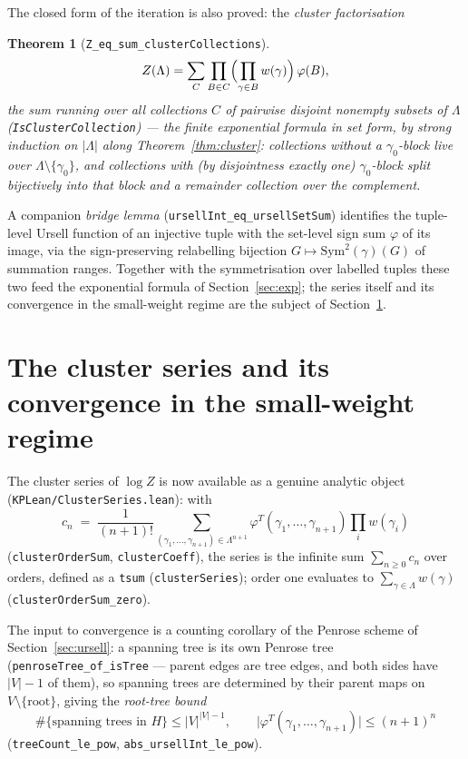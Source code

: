 \documentclass[11pt]{amsart}
\newtheorem{theorem}{Theorem}[section]
\begin{document}
The closed form of the iteration is also proved: the \emph{cluster
factorisation}

\begin{theorem}[\texttt{Z\_eq\_sum\_clusterCollections}]\label{thm:fact}
\[
  Z(\Lambda) = \sum_{C} \prod_{B \in C}
  \Bigl(\prod_{\gamma \in B} w(\gamma)\Bigr)\, \varphi(B),
\]
the sum running over all collections $C$ of pairwise disjoint nonempty
subsets of $\Lambda$ (\texttt{IsClusterCollection}) — the finite
exponential formula in set form, by strong induction on
$\lvert \Lambda \rvert$ along Theorem~\ref{thm:cluster}: collections
without a $\gamma_0$-block live over $\Lambda \setminus \{\gamma_0\}$,
and collections with (by disjointness exactly one) $\gamma_0$-block
split bijectively into that block and a remainder collection over the
complement.
\end{theorem}

A companion \emph{bridge lemma} (\texttt{ursellInt\_eq\_ursellSetSum})
identifies the tuple-level Ursell function of an injective tuple with
the set-level sign sum $\varphi$ of its image, via the sign-preserving
relabelling bijection $G \mapsto \mathrm{Sym}^2(\gamma)(G)$ of
summation ranges. Together with the symmetrisation over labelled
tuples these two feed the exponential formula of
Section~\ref{sec:exp}; the series itself and its convergence in the
small-weight regime are the subject of Section~\ref{sec:series}.

\section{The cluster series and its convergence in the small-weight
regime}\label{sec:series}

The cluster series of $\log Z$ is now available as a genuine analytic
object (\texttt{KPLean/ClusterSeries.lean}): with
\[
  c_{n} \;=\; \frac{1}{(n+1)!}
  \sum_{(\gamma_1, \dots, \gamma_{n+1}) \in \Lambda^{n+1}}
  \varphi^{T}(\gamma_1, \dots, \gamma_{n+1})
  \prod_{i} w(\gamma_i)
\]
(\texttt{clusterOrderSum}, \texttt{clusterCoeff}), the series is the
infinite sum $\sum_{n \ge 0} c_n$ over orders, defined as a
\texttt{tsum} (\texttt{clusterSeries}); order one evaluates to
$\sum_{\gamma \in \Lambda} w(\gamma)$
(\texttt{clusterOrderSum\_zero}).

The input to convergence is a counting corollary of the Penrose scheme
of Section~\ref{sec:ursell}: a spanning tree is its own Penrose tree
(\texttt{penroseTree\_of\_isTree} — parent edges are tree edges, and
both sides have $\lvert V\rvert - 1$ of them), so spanning trees are
determined by their parent maps on $V \setminus \{\mathrm{root}\}$,
giving the \emph{root-tree bound}
\[
  \#\{\text{spanning trees in } H\} \le \lvert V \rvert^{\lvert V \rvert - 1},
  \qquad
  \lvert \varphi^{T}(\gamma_1, \dots, \gamma_{n+1}) \rvert \le (n+1)^{n}
\]
(\texttt{treeCount\_le\_pow}, \texttt{abs\_ursellInt\_le\_pow}).
\end{document}
